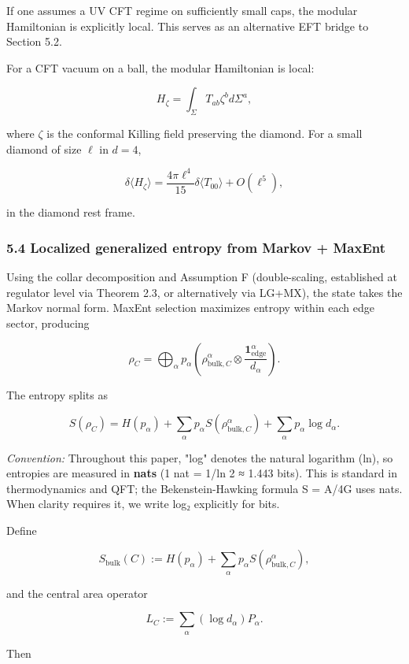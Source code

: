 If one assumes a UV CFT regime on sufficiently small caps, the modular Hamiltonian is explicitly local. This serves as an alternative EFT bridge to Section 5.2.

For a CFT vacuum on a ball, the modular Hamiltonian is local:

\[
H_{\zeta} = \int_{\Sigma} T_{ab} \zeta^b d\Sigma^a,
\]

where \(\zeta\) is the conformal Killing field preserving the diamond. For a small diamond of size \(\ell\) in \(d=4\),

\[
\delta \langle H_{\zeta} \rangle = \frac{4 \pi \ell^4}{15} \delta \langle T_{00} \rangle + O(\ell^5),
\]

in the diamond rest frame.

\subsubsection{5.4 Localized generalized entropy from Markov + MaxEnt}\label{54-localized-generalized-entropy-from-markov--maxent}

Using the collar decomposition and Assumption F (double-scaling, established at regulator level via Theorem 2.3, or alternatively via LG+MX), the state takes the Markov normal form. MaxEnt selection maximizes entropy within each edge sector, producing

\[
\rho_C = \bigoplus_{\alpha} p_{\alpha}
\left(\rho_{\mathrm{bulk},C}^{\alpha} \otimes \frac{\mathbf 1_{\mathrm{edge}}^{\alpha}}{d_{\alpha}}\right).
\]

The entropy splits as

\[
S(\rho_C) = H(p_{\alpha}) + \sum_{\alpha} p_{\alpha} S(\rho_{\mathrm{bulk},C}^{\alpha}) + \sum_{\alpha} p_{\alpha} \log d_{\alpha}.
\]

\emph{Convention:} Throughout this paper, "log" denotes the natural logarithm (ln), so entropies are measured in \textbf{nats} (1 nat = 1/ln 2 ≈ 1.443 bits). This is standard in thermodynamics and QFT; the Bekenstein-Hawking formula S = A/4G uses nats. When clarity requires it, we write log₂ explicitly for bits.

Define

\[
S_{\mathrm{bulk}}(C) := H(p_{\alpha}) + \sum_{\alpha} p_{\alpha} S(\rho_{\mathrm{bulk},C}^{\alpha}),
\]

and the central area operator

\[
L_C := \sum_{\alpha} (\log d_{\alpha}) P_{\alpha}.
\]

Then


